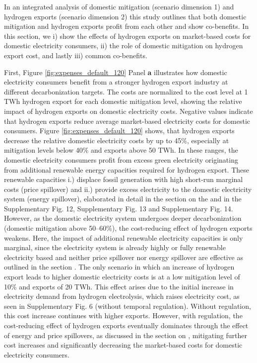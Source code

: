 In an integrated analysis of domestic \co mitigation (scenario dimension 1) and hydrogen exports (scenario dimension 2) this study outlines that both domestic \co mitigation and hydrogen exports profit from each other and show co-benefits. In this section, we i) show the effects of hydrogen exports on market-based costs for domestic electricity consumers, ii) the role of domestic \co mitigation on hydrogen export cost, and lastly iii) common co-benefits.

First, Figure \ref{fig:expenses_default_120} Panel \textbf{a} illustrates how domestic electricity consumers benefit from a stronger hydrogen export industry at different decarbonization targets. The costs are normalized to the cost level at 1 TWh hydrogen export for each domestic \co mitigation level, showing the relative impact of hydrogen exports on domestic electricity costs. Negative values indicate that hydrogen exports reduce average market-based electricity costs for domestic consumers.
Figure \ref{fig:expenses_default_120} shows, that hydrogen exports decrease the relative domestic electricity costs by up to 45\%, especially at mitigation levels below 40\% and exports above 50 TWh. 
In these ranges, the domestic electricity consumers profit from excess green electricity originating from additional renewable energy capacities required for hydrogen export. These renewable capacities i.) displace fossil generation with high short-run marginal costs (price spillover) and ii.) provide excess electricity to the domestic electricity system (energy spillover), elaborated in detail in the section on the  and in the Supplementary Fig. 12, Supplementary Fig. 13 and Supplementary Fig. 14. %
However, as the domestic electricity system undergoes deeper decarbonization (domestic \co mitigation above 50--60\%), the cost-reducing effect of hydrogen exports weakens. Here, the impact of additional renewable electricity capacities is only marginal, since the electricity system is already highly or fully renewable electricity based and neither price spillover nor energy spillover are effective as outlined in the section .
The only scenario in which an increase of hydrogen export leads to higher domestic electricity costs is at a low \co mitigation level of 10\% and exports of 20 TWh.
This effect arises due to the initial increase in electricity demand from hydrogen electrolysis, which raises electricity cost, as seen in Supplementary Fig. 6 (without temporal regulation). %
Without regulation, this cost increase continues with higher exports. However, with regulation, the cost-reducing effect of hydrogen exports eventually dominates through the effect of energy and price spillovers, as discussed in the section on , mitigating further cost increases and significantly decreasing the market-based costs for domestic electricity consumers.

